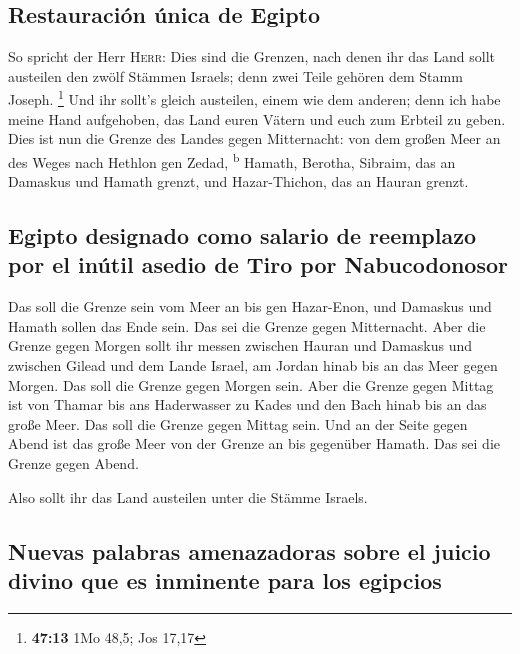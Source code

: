 \hypertarget{restauraciuxf3n-uxfanica-de-egipto}{%
\subsection{Restauración única de
Egipto}\label{restauraciuxf3n-uxfanica-de-egipto}}

 So spricht der Herr \textsc{Herr}: Dies sind die
Grenzen, nach denen ihr das Land sollt austeilen den zwölf Stämmen
Israels; denn zwei Teile gehören dem Stamm Joseph. \footnote{\textbf{47:13}
  1Mo 48,5; Jos 17,17}  Und ihr sollt's gleich austeilen,
einem wie dem anderen; denn ich habe meine Hand aufgehoben, das Land
euren Vätern und euch zum Erbteil zu geben.  Dies ist nun
die Grenze des Landes gegen Mitternacht: von dem großen Meer an des
Weges nach Hethlon gen Zedad, \textsuperscript{b} 
Hamath, Berotha, Sibraim, das an Damaskus und Hamath grenzt, und
Hazar-Thichon, das an Hauran grenzt.

\hypertarget{egipto-designado-como-salario-de-reemplazo-por-el-inuxfatil-asedio-de-tiro-por-nabucodonosor}{%
\subsection{Egipto designado como salario de reemplazo por el inútil
asedio de Tiro por
Nabucodonosor}\label{egipto-designado-como-salario-de-reemplazo-por-el-inuxfatil-asedio-de-tiro-por-nabucodonosor}}

 Das soll die Grenze sein vom Meer an bis gen Hazar-Enon,
und Damaskus und Hamath sollen das Ende sein. Das sei die Grenze gegen
Mitternacht.  Aber die Grenze gegen Morgen sollt ihr
messen zwischen Hauran und Damaskus und zwischen Gilead und dem Lande
Israel, am Jordan hinab bis an das Meer gegen Morgen. Das soll die
Grenze gegen Morgen sein.  Aber die Grenze gegen Mittag
ist von Thamar bis ans Haderwasser zu Kades und den Bach hinab bis an
das große Meer. Das soll die Grenze gegen Mittag sein. 
Und an der Seite gegen Abend ist das große Meer von der Grenze an bis
gegenüber Hamath. Das sei die Grenze gegen Abend.

 Also sollt ihr das Land austeilen unter die Stämme
Israels.

\hypertarget{nuevas-palabras-amenazadoras-sobre-el-juicio-divino-que-es-inminente-para-los-egipcios}{%
\subsection{Nuevas palabras amenazadoras sobre el juicio divino que es
inminente para los
egipcios}\label{nuevas-palabras-amenazadoras-sobre-el-juicio-divino-que-es-inminente-para-los-egipcios}}

